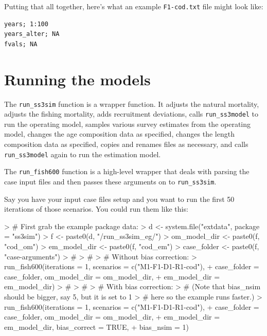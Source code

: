 \documentclass[12pt]{article}
\begin{document}
Putting that all together, here's what an example \texttt{F1-cod.txt} file 
might look like:

\begin{verbatim}
years; 1:100
years_alter; NA 
fvals; NA
\end{verbatim}

\section*{Running the models}

The \texttt{run\_ss3sim} function is a wrapper function. It adjusts the natural 
mortality, adjusts the fishing mortality, adds recruitment deviations, calls 
\texttt{run\_ss3model} to run the operating model, samples various survey 
estimates from the operating model, changes the age composition data as 
specified, changes the length composition data as specified, copies and renames 
files as necessary, and calls \texttt{run\_ss3model} again to run the 
estimation model.

The \texttt{run\_fish600} function is a high-level wrapper that deals with 
parsing the case input files and then passes these arguments on to 
\texttt{run\_ss3sim}.

Say you have your input case files setup and you want to run the first 
50 iterations of those scenarios. You could run them like this:

\begin{Schunk}
\begin{Sinput}
> # First grab the example package data:
> d <- system.file("extdata", package = "ss3sim")
> f <- paste0(d, "/run_ss3sim_eg/")
> om_model_dir <- paste0(f, "cod_om")
> em_model_dir <- paste0(f, "cod_em")
> case_folder <- paste0(f, "case-arguments")
> #
> #
> # Without bias correction:
> run_fish600(iterations = 1, scenarios = c("M1-F1-D1-R1-cod"),
+ case_folder = case_folder, om_model_dir = om_model_dir,
+ em_model_dir = em_model_dir)
> #
> #
> # With bias correction:
> # (Note that bias_nsim should be bigger, say 5, but it is set to 1
> # here so the example runs faster.)
> run_fish600(iterations = 1, scenarios = c("M1-F1-D1-R1-cod"),
+ case_folder = case_folder, om_model_dir = om_model_dir,
+ em_model_dir = em_model_dir, bias_correct = TRUE,
+ bias_nsim = 1)
\end{Sinput}
\end{Schunk}


\end{document}
